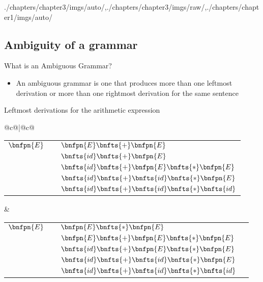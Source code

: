 \begin{graphicspathcontext}{{./chapters/chapter3/imgs/auto/},{./chapters/chapter3/imgs/raw/},{./chapters/chapter1/imgs/auto/}}
\begin{bibunit}[apalike]
\subsection{Ambiguity of a grammar}
\subsubsectiontableofcontentslide

\begin{frame}{{What is an} Ambiguous Grammar?}
	\begin{small}
	\begin{itemize}
	\item An ambiguous grammar is one that produces more than one leftmost derivation or more than one rightmost derivation for the same sentence
	\end{itemize}
	\begin{example}
		Leftmost derivations for the arithmetic expression \bnfts{+}\bnfts{*}
	\end{example}
	\end{small}
	\begin{tiny}
	\begin{tabular*}{\linewidth}{@{}c@{}|@{}c@{}}
		\begin{tabular}{lcl}
			$\bnfpn{E}$ & \deriv & $\bnfpn{E} \bnfts{+} \bnfpn{E}$ \\
			& \deriv & $\bnfts{id} \bnfts{+} \bnfpn{E}$ \\
			& \deriv & $\bnfts{id} \bnfts{+} \bnfpn{E} \bnfts{*} \bnfpn{E}$ \\
			& \deriv & $\bnfts{id} \bnfts{+} \bnfts{id} \bnfts{*} \bnfpn{E}$ \\
			& \deriv & $\bnfts{id} \bnfts{+} \bnfts{id} \bnfts{*} \bnfts{id}$
		\end{tabular}
	&
		\begin{tabular}{lcll}
				$\bnfpn{E}$ & \deriv & $\bnfpn{E} \bnfts{*} \bnfpn{E}$ \\
				  & \deriv & $\bnfpn{E} \bnfts{+} \bnfpn{E} \bnfts{*} \bnfpn{E}$ \\
				  & \deriv & $\bnfts{id} \bnfts{+} \bnfpn{E} \bnfts{*} \bnfpn{E}$ \\
				  & \deriv & $\bnfts{id} \bnfts{+} \bnfts{id} \bnfts{*} \bnfpn{E}$ \\
				  & \deriv & $\bnfts{id} \bnfts{+} \bnfts{id} \bnfts{*} \bnfts{id}$
		\end{tabular}
	\end{tabular*}
	\end{tiny}
\end{frame}


\end{bibunit}
\end{graphicspathcontext}
